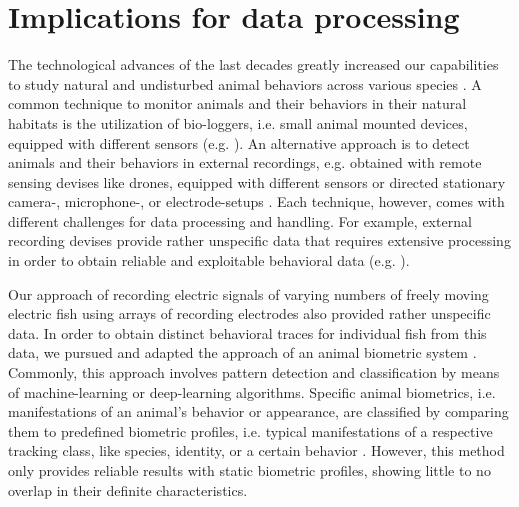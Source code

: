 \documentclass[11pt,pdftex]{article}
\begin{document}
\section{Implications for data processing}

The technological advances of the last decades greatly increased our capabilities to study natural and undisturbed animal behaviors across various species \citep{Hughey2018, Jolles2021}. A common technique to monitor animals and their behaviors in their natural habitats is the utilization of bio-loggers, i.e. small animal mounted devices, equipped with different sensors (e.g. \citealp{Strandburg2015}). An alternative approach is to detect animals and their behaviors in external recordings, e.g. obtained with remote sensing devises like drones, equipped with different sensors or directed stationary camera-, microphone-, or electrode-setups \citep{Anderson2014, Dell2014, Hughey2018}. Each technique, however, comes with different challenges for data processing and handling. For example, external recording devises provide rather unspecific data that requires extensive processing in order to obtain reliable and exploitable behavioral data (e.g. \citealp{Kuhl2013, Dell2014}).

Our approach of recording electric signals of varying numbers of freely moving electric fish using arrays of recording electrodes also provided rather unspecific data. In order to obtain distinct behavioral traces for individual fish from this data, we pursued and adapted the approach of an animal biometric system \citep{Kuhl2013}. Commonly, this approach involves pattern detection and classification by means of machine-learning or deep-learning algorithms. Specific animal biometrics, i.e. manifestations of an animal's behavior or appearance, are classified by comparing them to predefined biometric profiles, i.e. typical manifestations of a respective tracking class, like species, identity, or a certain behavior \citep{Burghardt2006, Sherley2010, Ernst2011}. However, this method only provides reliable results with static biometric profiles, showing little to no overlap in their definite characteristics. 
\end{document}
